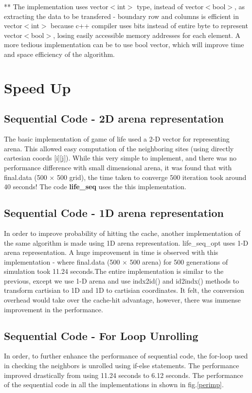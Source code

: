 \documentclass[a4paper, 10pt, conference]{IEEEtran}      %
\begin{document}
	** The implementation uses vector$<$int$>$ type, instead of vector$<$bool$>$, as extracting the data to be transfered - boundary row and columns is efficient in vector$<$int$>$ because c++ compiler uses bits instead of entire byte to represent vector$<$bool$>$, losing easily accessible memory addresses for each element. A more tedious implementation can be to use bool vector, which will improve time and space efficiency of the algorithm.
	
	\section{Speed Up} \label{speedup}
	\subsection{Sequential Code - 2D arena representation}
	The basic implementation of game of life used a 2-D vector for representing arena. This allowed easy computation of the neighboring sites (using directly cartesian coords [i][j]). While this very simple to implement, and there was no performance difference with small dimensional arena, it was found that with final.data (500 $\times$ 500 grid), the time taken to converge 500 iteration took around 40 seconds! The code \textbf{life\_seq} uses the this implementation.
	
	\subsection{Sequential Code - 1D arena representation}
	In order to improve probability of hitting the cache, another implementation of the same algorithm is made using 1D arena representation. life\_seq\_opt uses 1-D arena representation. A huge improvement in time is observed with this implementation - where final.data (500 $\times$ 500 arena) for 500 generations of simulation took 11.24 seconds.The entire implementation is similar to the previous, except we use 1-D arena and use indx2id() and id2indx() methods to transform cartisian to 1D and 1D to cartisian coordinates. It felt, the conversion overhead would take over the cache-hit advantage, however, there was immense improvement in the performance. 
	
	\subsection{Sequential Code - For Loop Unrolling}
	In order, to further enhance the performance of sequential code, the for-loop used in checking the neighbors is unrolled using if-else statements. The performance improved drastically from using 11.24 seconds to 6.12 seconds. The performance of the sequential code in all the implementations in shown in fig.\ref{perimp}.
	
\end{document}
